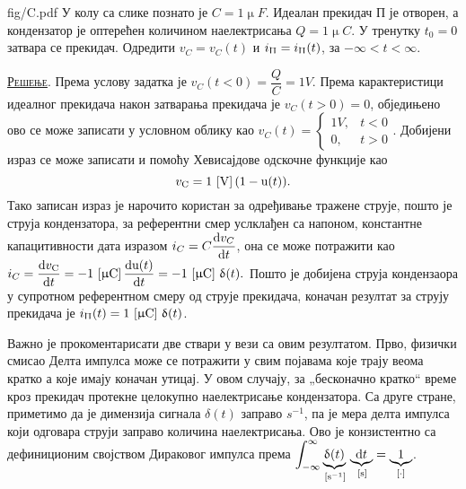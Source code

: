 \noindent
\begin{slikaDesno}[0.833]{fig/C.pdf}\noindent
\PID \label{ID:capID}
У колу са слике познато је 
$C = 1 \unit{\upmu F}$. 
Идеалан прекидач П је отворен, а кондензатор је оптерећен количином
наелектрисања $Q = 1 \unit{\upmu C}$. У тренутку $t_0 = 0$ затвара се прекидач. 
Одредити $v_{C} = v_{C}(t)$        
и $i_{\Uppi} = i_{\Uppi}(t)$, за $-\infty < t < \infty$. 
\end{slikaDesno}

\textsc{\underline{Решење}}.
Према услову задатка је 
\vspace{1mm}
$v_C(t < 0) = \dfrac{Q}{C} = 1\unit{V}$. Према карактеристици идеалног прекидача
након затварања прекидача је $v_C(t > 0) = 0$, обједињено ово се може записати у условном облику као 
$
v_C(t) = 
\begin{cases}
        1\unit{V},&  t < 0 \\
        0,        &  t > 0
\end{cases}.
$ Добијени израз се може записати и помоћу Хевисајдове одскочне функције као 
\begin{equation}
v_{\rm C} = 1\,\left[\mathrm{V}\right] ( 1 - {\rm u}(t) ). 
\end{equation}
Тако записан израз је нарочито користан за одређивање тражене струје, пошто је струја кондензатора, 
за референтни смер услклађен са напоном, 
константне капацитивности дата изразом $i_C = C\dfrac{{\rm d} v_C}{{\rm d} t}$, она се може потражити као
$
i_C = \dfrac{{\rm d} v_{\rm C}}{{\rm d} t} = - 1\,\left[\mathrm{\upmu C}\right] \dfrac{{\rm d} {\rm u}(t)}{{\rm d} t}  = 
- 1\,\left[\mathrm{\upmu C}\right] \, \updelta(t). 
$
Пошто је добијена струја кондензаора у супротном референтном смеру од струје прекидача, коначан 
резултат за струју прекидача је 
$i_{\Uppi}(t) = 1\,\left[\mathrm{\upmu C}\right] \, \updelta(t)$.

Важно је прокоментарисати две ствари у вези са овим резултатом. Прво, физички смисао Делта импулса може
се потражити у свим појавама које трају веома кратко а које имају коначан утицај. У овом случају, 
за „бесконачно кратко“ време кроз прекидач протекне целокупно наелектрисање кондензатора. Са друге 
стране, приметимо да је димензија сигнала $\delta(t)$ заправо $\unit{s^{-1}}$, па је мера делта импулса
који одговара струји заправо количина наелектрисања. Ово је конзистентно са дефиниционим својством
Дираковог импулса према $\displaystyle \int_{-\infty}^{\infty} 
\underbrace{\updelta(t)}_{\,\left[\mathrm{s^{-1}}\right]} \, 
\underbrace{{\rm d} t}_{\,\left[\mathrm{s}\right]} = \underbrace{1}_{[\cdot]}$.